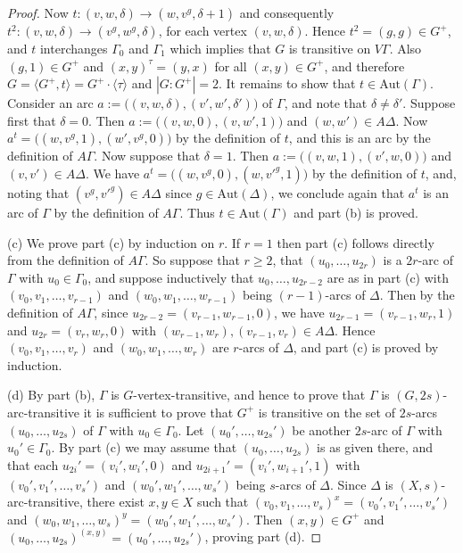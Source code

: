 \documentclass[11pt]{amsart}
\newcommand{\Aut}{\mathrm{Aut}}
\begin{document}
\begin{proof}
   Now  \(t: (v,w,\delta)\to (w,v^g,\delta+1)\) and consequently \(t^2:(v,w,\delta)\to (v^g,w^g,\delta)\), for each vertex $(v,w,\delta)$. Hence $t^2=(g,g)\in G^+$, and $t$ interchanges $\Gamma_0$ and $\Gamma_1$ which implies that $G$ is transitive on $V\Gamma$. 
   Also $(g,1)\in G^+$ and  $(x,y)^\tau =(y,x)$ for all $(x,y)\in G^+$, and therefore $G=\langle G^+, t\rangle = G^+\cdot \langle \tau\rangle$ and $|G:G^+|=2$.  It remains to show that  $t\in\Aut(\Gamma)$. Consider an arc  $a:= \big((v,w,\delta),(v',w',\delta')\big)$ of $\Gamma$, and note that $\delta\ne\delta'$. 
            Suppose first that $\delta=0$. Then $a:= \big((v,w,0),(v, w',1)\big)$ and $(w,w')\in A\Delta$. Now $a^t = \big((w,v^g,1),(w', v^g,0)\big)$ by the definition of $t$, and this is an arc by the definition of $A\Gamma$.
            Now suppose that $\delta=1$. Then $a:= \big((v,w,1),(v', w,0)\big)$ and $(v,v')\in A\Delta$. We have $a^t = \big((w,v^g,0),(w, v'^g,1)\big)$ by the definition of $t$, and, noting that $(v^g,v'^g)\in A\Delta$ since $g\in\Aut(\Delta)$, we conclude again that $a^t$ is an arc of $\Gamma$ by the definition of $A\Gamma$. Thus $t\in\Aut(\Gamma)$ and part (b) is proved.

\smallskip
(c) We prove part (c) by induction on $r$. If $r=1$ then part (c) follows directly from the definition of $A\Gamma$. So suppose that $r\geq2$, that   $(u_0,\dots, u_{2r})$ is a $2r$-arc of $\Gamma$ with $u_0\in \Gamma_0$, and suppose inductively that $u_0,\dots, u_{2r-2}$ are as in part (c) with  $(v_0,v_1,\dots,v_{r-1})$ and $(w_0,w_1,\dots,w_{r-1})$ being $(r-1)$-arcs of $\Delta$. Then by  the definition of $A\Gamma$, since $u_{2r-2}=(v_{r-1}, w_{r-1}, 0)$, we have 
$u_{2r-1}=(v_{r-1}, w_{r}, 1)$ and $u_{2r}=(v_{r}, w_{r}, 0)$ with $(w_{r-1},w_r), (v_{r-1},v_r)\in A\Delta$. Hence $(v_0,v_1,\dots,v_{r})$ and $(w_0,w_1,\dots,w_{r})$ are $r$-arcs of $\Delta$, and part (c) is proved by induction.

\smallskip
(d) By part (b), $\Gamma$ is $G$-vertex-transitive, and hence to prove that  $\Gamma$ is $(G, 2s)$-arc-transitive it is sufficient to prove that $G^+$ is transitive on the set of $2s$-arcs $(u_0,\dots, u_{2s})$ of $\Gamma$  with $u_0\in \Gamma_0$. Let  $(u_0',\dots, u_{2s}')$ be another $2s$-arc of $\Gamma$ with $u_0'\in \Gamma_0$.  By part (c) we may assume that  $(u_0,\dots, u_{2s})$ is as given there, and that each $u_{2i}'=(v_{i}', w_{i}', 0)$ and $u_{2i+1}'=(v_{i}', w_{i+1}', 1)$ with  $(v_0',v_1',\dots,v_{s}')$ and $(w_0',w_1',\dots,w_{s}')$ being $s$-arcs of $\Delta$. Since $\Delta$ is $(X,s)$-arc-transitive, there exist $x,y\in X$ such that  $(v_0,v_1,\dots,v_{s})^x=(v_0',v_1',\dots,v_{s}')$ and $(w_0,w_1,\dots,w_{s})^y=(w_0',w_1',\dots,w_{s}')$. Then $(x,y)\in G^+$ and $(u_0,\dots, u_{2s})^{(x,y)}= (u_0',\dots, u_{2s}')$, proving part (d). 
\end{proof}
\end{document}

